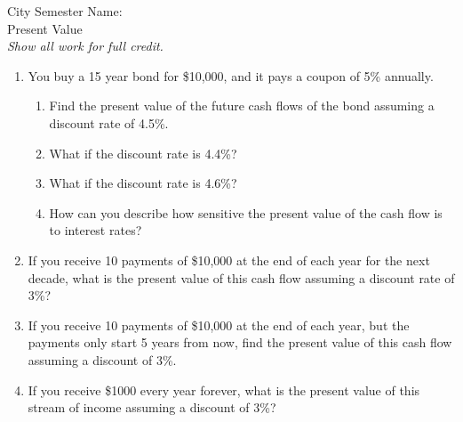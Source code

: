 \documentclass[12pt]{article}
\theoremstyle{plain}     %
\begin{document}
\large
City Semester  \hspace{8cm} Name:\makebox[6cm]{\hrulefill}
\\
Present Value\\
\normalsize 
\emph{Show all work for full credit.}
\begin{enumerate}
	\item You buy a 15 year bond for \$10,000, and it pays a coupon of 5\% annually.
		\begin{enumerate}
			\item Find the present value of the future cash flows of the bond assuming a discount rate of 4.5\%. 
			\item What if the discount rate is 4.4\%? 
			\item What if the discount rate is 4.6\%?
			\item How can you describe how sensitive the present value of the cash flow is to interest rates?
		\end{enumerate}
	\item If you receive 10 payments of \$10,000 at the end of each year for the next decade, what is the present value of this cash flow assuming a discount rate of 3\%?
	\item If you receive 10 payments of \$10,000 at the  end of each year, but the payments only start 5 years from now, find the present value of this cash flow assuming a discount of 3\%.
	\item If you receive \$1000 every year forever, what is the present value of this stream of income assuming a discount of 3\%?
\end{enumerate}
	
\end{document}
